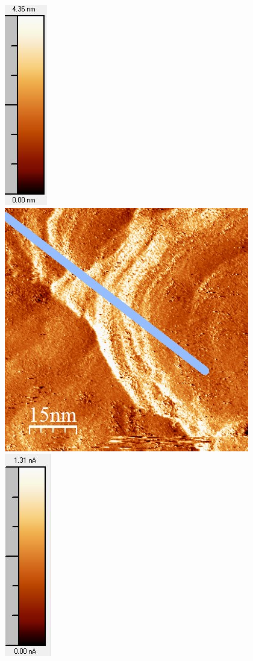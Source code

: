 \documentclass[12pt,a4paper]{article}
\begin{document}
\begin{figure}[H]
\includegraphics[scale=0.6]{Bilder/Anhang/IGain/1000_IGain_nach_Skala.jpg}
\includegraphics[scale=0.6]{Bilder/Anhang/IGain/Strom/1000_IGain_Strom_vor.jpg}
\includegraphics[scale=0.6]{Bilder/Anhang/IGain/Strom/1000_IGain_Strom_vor_Skala.jpg}

\end{figure}
\end{document}
